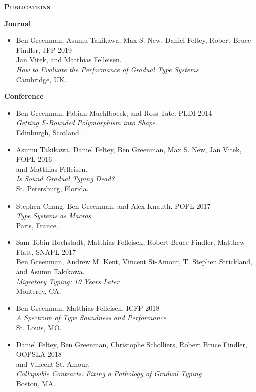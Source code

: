 \documentclass{article}
\newcommand{\mysection}[1]{\vspace{0.5cm} \noindent\textsc{\textbf{#1}}~\hrulefill}
\newcommand{\mysubsection}[1]{\noindent\textbf{#1}}
\begin{document}
\mysection{Publications}

\mysubsection{Journal}
\begin{itemize}
\item
  Ben Greenman, Asumu Takikawa, Max S. New, Daniel Feltey, Robert Bruce Findler, \hfill JFP 2019 \\
  Jan Vitek, and Matthias Felleisen. \\
  \emph{How to Evaluate the Performance of Gradual Type Systems} \\
  Cambridge, UK.
\end{itemize}

\mysubsection{Conference}
\begin{itemize}
\item
  Ben Greenman, Fabian Muehlboeck, and Ross Tate. \hfill PLDI 2014 \\
  \emph{Getting F-Bounded Polymorphism into Shape}. \\
  Edinburgh, Scotland.
\item
  Asumu Takikawa, Daniel Feltey, Ben Greenman, Max S. New, Jan Vitek, \hfill POPL 2016 \\
   and Matthias Felleisen. \\
   \emph{Is Sound Gradual Typing Dead?} \\
  St. Petersburg, Florida.
\item
  Stephen Chang, Ben Greenman, and Alex Knauth. \hfill POPL 2017 \\
   \emph{Type Systems as Macros} \\
  Paris, France.
\item
  Sam Tobin-Hochstadt, Matthias Felleisen, Robert Bruce Findler, Matthew Flatt, \hfill SNAPL 2017 \\
  Ben Greenman, Andrew M. Kent, Vincent St-Amour, T. Stephen Strickland, \\
  and Asumu Takikawa. \\
  \emph{Migratory Typing: 10 Years Later} \\
  Monterey, CA.
\item
  Ben Greenman, Matthias Felleisen. \hfill ICFP 2018 \\
  \emph{A Spectrum of Type Soundness and Performance} \\
  St. Louis, MO.
\item
  Daniel Feltey, Ben Greenman, Christophe Scholliers, Robert Bruce Findler, \hfill OOPSLA 2018 \\
  and Vincent St. Amour. \\
  \emph{Collapsible Contracts: Fixing a Pathology of Gradual Typing} \\
  Boston, MA.
\end{itemize}
\end{document}

